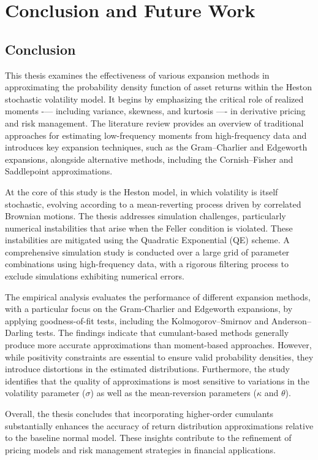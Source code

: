 \chapter{Conclusion and Future Work}
\label{sec:conclusion_future_work}

\section{Conclusion}

This thesis examines the effectiveness of various expansion methods in approximating the probability density function of asset returns within the Heston stochastic volatility model. It begins by emphasizing the critical role of realized moments -— including variance, skewness, and kurtosis —- in derivative pricing and risk management. The literature review provides an overview of traditional approaches for estimating low-frequency moments from high-frequency data and introduces key expansion techniques, such as the Gram–Charlier and Edgeworth expansions, alongside alternative methods, including the Cornish–Fisher and Saddlepoint approximations.

At the core of this study is the Heston model, in which volatility is itself stochastic, evolving according to a mean-reverting process driven by correlated Brownian motions. The thesis addresses simulation challenges, particularly numerical instabilities that arise when the Feller condition is violated. These instabilities are mitigated using the Quadratic Exponential (QE) scheme. A comprehensive simulation study is conducted over a large grid of parameter combinations using high-frequency data, with a rigorous filtering process to exclude simulations exhibiting numerical errors.

The empirical analysis evaluates the performance of different expansion methods, with a particular focus on the Gram-Charlier and Edgeworth expansions, by applying goodness-of-fit tests, including the Kolmogorov–Smirnov and Anderson–Darling tests. The findings indicate that cumulant-based methods generally produce more accurate approximations than moment-based approaches. However, while positivity constraints are essential to ensure valid probability densities, they introduce distortions in the estimated distributions. Furthermore, the study identifies that the quality of approximations is most sensitive to variations in the volatility parameter ($\sigma$) as well as the mean-reversion parameters ($\kappa$ and $\theta$).

Overall, the thesis concludes that incorporating higher-order cumulants substantially enhances the accuracy of return distribution approximations relative to the baseline normal model. These insights contribute to the refinement of pricing models and risk management strategies in financial applications.

